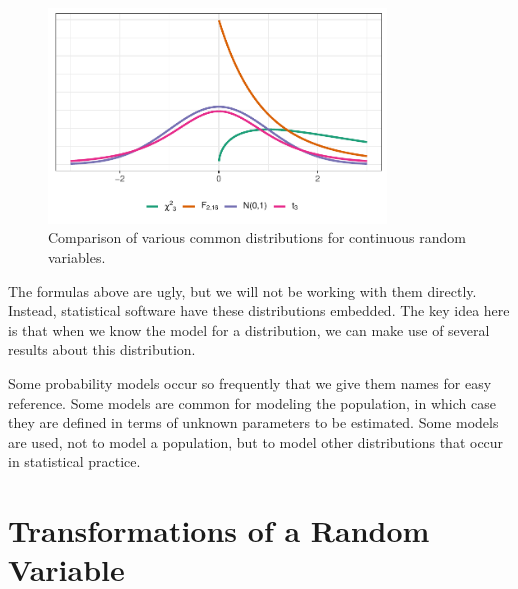 \documentclass[
  letterpaper,
  DIV=11,
  numbers=noendperiod]{scrreprt}
\theoremstyle{plain}
\theoremstyle{definition}
\theoremstyle{definition}
\theoremstyle{remark}
\begin{document}
\begin{figure}

{\centering \includegraphics[width=0.8\textwidth,height=\textheight]{./images/fig-randomvariables-comparisons-1.pdf}

}

\caption{\label{fig-randomvariables-comparisons}Comparison of various
common distributions for continuous random variables.}

\end{figure}

The formulas above are ugly, but we will not be working with them
directly. Instead, statistical software have these distributions
embedded. The key idea here is that when we know the model for a
distribution, we can make use of several results about this
distribution.

\begin{tcolorbox}[enhanced jigsaw, toprule=.15mm, left=2mm, title=\textcolor{quarto-callout-tip-color}{\faLightbulb}\hspace{0.5em}{Big Idea}, opacityback=0, toptitle=1mm, leftrule=.75mm, colbacktitle=quarto-callout-tip-color!10!white, opacitybacktitle=0.6, titlerule=0mm, breakable, colframe=quarto-callout-tip-color-frame, arc=.35mm, coltitle=black, bottomtitle=1mm, rightrule=.15mm, colback=white, bottomrule=.15mm]

Some probability models occur so frequently that we give them names for
easy reference. Some models are common for modeling the population, in
which case they are defined in terms of unknown parameters to be
estimated. Some models are used, not to model a population, but to model
other distributions that occur in statistical practice.

\end{tcolorbox}

\hypertarget{transformations-of-a-random-variable}{%
\section{Transformations of a Random
Variable}\label{transformations-of-a-random-variable}}
\end{document}
